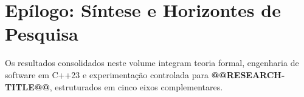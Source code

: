 \chapter*{Epílogo: Síntese e Horizontes de Pesquisa}\label{sec:conclusoes}

Os resultados consolidados neste volume integram teoria formal, engenharia de software em C++23 e experimentação controlada para \textbf{@@RESEARCH-TITLE@@}, estruturados em cinco eixos complementares.
